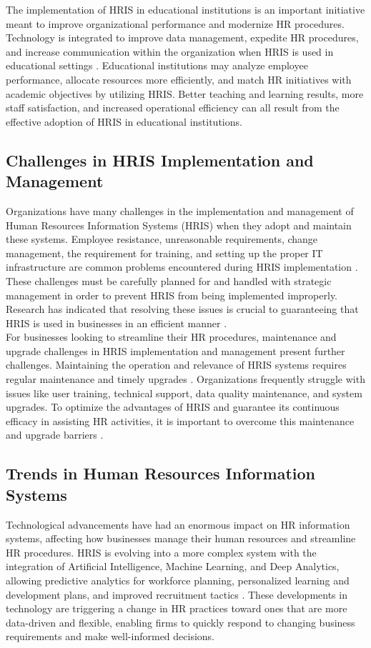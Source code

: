     	The implementation of HRIS in educational institutions is an important initiative meant to improve organizational performance and modernize HR procedures. Technology is integrated to improve data management, expedite HR procedures, and increase communication within the organization when HRIS is used in educational settings \cite{s12020}. Educational institutions may analyze employee performance, allocate resources more efficiently, and match HR initiatives with academic objectives by utilizing HRIS. Better teaching and learning results, more staff satisfaction, and increased operational efficiency can all result from the effective adoption of HRIS in educational institutions.

    \subsection{Challenges in HRIS Implementation and Management}
        Organizations have many challenges in the implementation and management of Human Resources Information Systems (HRIS) when they adopt and maintain these systems. Employee resistance, unreasonable requirements, change management, the requirement for training, and setting up the proper IT infrastructure are common problems encountered during HRIS implementation \cite{kben12022}. These challenges must be carefully planned for and handled with strategic management in order to prevent HRIS from being implemented improperly. Research has indicated that resolving these issues is crucial to guaranteeing that HRIS is used in businesses in an efficient manner \cite{arc12020}.
        \\
        
        For businesses looking to streamline their HR procedures, maintenance and upgrade challenges in HRIS implementation and management present further challenges. Maintaining the operation and relevance of HRIS systems requires regular maintenance and timely upgrades \cite{ecaj12021}. Organizations frequently struggle with issues like user training, technical support, data quality maintenance, and system upgrades. To optimize the advantages of HRIS and guarantee its continuous efficacy in assisting HR activities, it is important to overcome this maintenance and upgrade barriers \cite{m12024}.

    \subsection{Trends in Human Resources Information Systems}
        Technological advancements have had an enormous impact on HR information systems, affecting how businesses manage their human resources and streamline HR procedures. HRIS is evolving into a more complex system with the integration of Artificial Intelligence, Machine Learning, and Deep Analytics, allowing predictive analytics for workforce planning, personalized learning and development plans, and improved recruitment tactics \cite{p12024}. These developments in technology are triggering a change in HR practices toward ones that are more data-driven and flexible, enabling firms to quickly respond to changing business requirements and make well-informed decisions.
        \\

